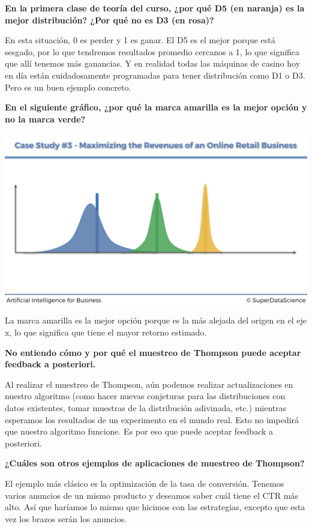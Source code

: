 \documentclass[]{book}
\begin{document}
\textbf{En la primera clase de teoría del curso, ¿por qué D5 (en naranja) es la mejor distribución? ¿Por qué no es D3 (en rosa)?}

En esta situación, 0 es perder y 1 es ganar. El D5 es el mejor porque está sesgado, por lo que tendremos resultados promedio cercanos a 1, lo que significa que allí tenemos más ganancias. Y en realidad todas las máquinas de casino hoy en día están cuidadosamente programadas para tener distribución como D1 o D3. Pero es un buen ejemplo concreto.

\textbf{En el siguiente gráfico, ¿por qué la marca amarilla es la mejor opción y no la marca verde?}

\includegraphics{Images/Beta_Distribution_Slide.png}

La marca amarilla es la mejor opción porque es la más alejada del origen en el eje x, lo que significa que tiene el mayor retorno estimado.

\textbf{No entiendo cómo y por qué el muestreo de Thompson puede aceptar feedback a posteriori.}

Al realizar el muestreo de Thompson, aún podemos realizar actualizaciones en nuestro algoritmo (como hacer nuevas conjeturas para las distribuciones con datos existentes, tomar muestras de la distribución adivinada, etc.) mientras esperamos los resultados de un experimento en el mundo real. Esto no impedirá que nuestro algoritmo funcione. Es por eso que puede aceptar feedback a posteriori.

\textbf{¿Cuáles son otros ejemplos de aplicaciones de muestreo de Thompson?}

El ejemplo más clásico es la optimización de la tasa de conversión. Tenemos varios anuncios de un mismo producto y deseamos saber cuál tiene el CTR más alto. Así que haríamos lo mismo que hicimos con las estrategias, excepto que esta vez los brazos serán los anuncios.
\end{document}
